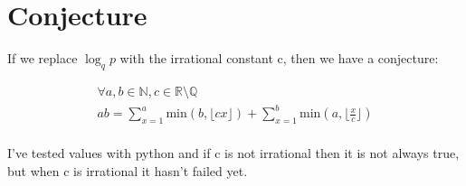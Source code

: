 \documentclass{article}
\begin{document}
\section{Conjecture} 
If we replace $\log_q p$ with the irrational constant c, then we have a conjecture:
\begin{tcolorbox}
\begin{equation*}
\begin{split}
    \forall a,b \in \mathbb{N}, c \in \mathbb{R} \setminus \mathbb{Q}\\
    ab = \sum_{x=1}^a \text{min}(b, \big\lfloor cx\big\rfloor) + \sum_{x=1}^b \text{min}(a, \big\lfloor \frac{x}{c} \big\rfloor)\\
\end{split}
\end{equation*}
\end{tcolorbox}
I've tested values with python and if c is not irrational then it is not always true, but when c is irrational it hasn't failed yet.
\end{document}
